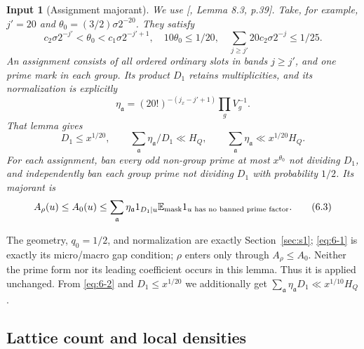 \documentclass[11pt]{article}
\newtheorem{inputthm}[theorem]{Input}
\theoremstyle{definition}
\theoremstyle{definition}
\begin{document}
\begin{inputthm}[Assignment majorant]\label{input:assignment}
We use [, Lemma 8.3, p.39]. Take, for example, \(j'=20\) and \(\theta_0=(3/2)\sigma2^{-20}\). They satisfy
\begin{equation}
c_2\sigma2^{-j'}<\theta_0<c_1\sigma2^{-j'+1},\quad
 10\theta_0\le1/20,\quad
 \sum_{j\ge j'}20c_2\sigma2^{-j}\le1/25.                 \tag{6.1}\label{eq:6-1}
\end{equation}
An assignment consists of all ordered ordinary slots in bands \(j\ge j'\), and one prime mark in each group. Its product \(D_1\) retains multiplicities, and its normalization is explicitly
\begin{equation*}
\eta_{\mathfrak a}=(20!)^{-(j_x-j'+1)}\prod_g V_g^{-1}.
\end{equation*}
That lemma gives
\begin{equation}
D_1\le x^{1/20},\qquad
 \sum_{\mathfrak a}\eta_{\mathfrak a}/D_1\ll H_Q,\qquad
 \sum_{\mathfrak a}\eta_{\mathfrak a}\ll x^{1/20}H_Q.     \tag{6.2}\label{eq:6-2}
\end{equation}
For each assignment, ban every odd non-group prime at most \(x^{\theta_0}\) not dividing \(D_1\), and independently ban each group prime not dividing \(D_1\) with probability \(1/2\). Its majorant is
\begin{equation}
A_\rho(u)\le A_0(u)\le
 \sum_{\mathfrak a}\eta_{\mathfrak a}1_{D_1\mid u}
       \mathbb E_{\rm mask}1_{u\text{ has no banned prime factor}}.
                                                        \tag{6.3}\label{eq:6-3}
\end{equation}
\end{inputthm}
The geometry, \(q_0=1/2\), and normalization are exactly Section~\ref{sec:s1}; \eqref{eq:6-1} is exactly its micro/macro gap condition; \(\rho\) enters only through \(A_\rho\le A_0\). Neither the prime form nor its leading coefficient occurs in this lemma. Thus it is applied unchanged. From \eqref{eq:6-2} and \(D_1\le x^{1/20}\) we additionally get
\(\sum_{\mathfrak a}\eta_{\mathfrak a}D_1\ll x^{1/10}H_Q\).

\subsection{Lattice count and local densities}\label{sec:s6.2}
\end{document}
